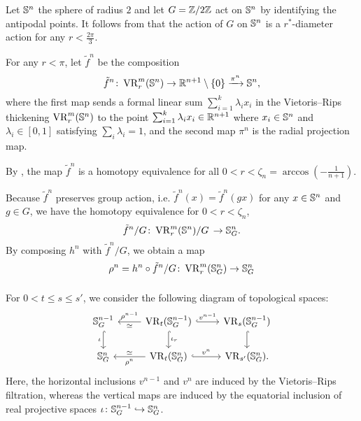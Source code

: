 Let $\mathbb{S}^n$ the sphere of radius $2$ and let $G=\mathbb{Z}/2\mathbb{Z}$ act on $\mathbb{S}^n$ by identifying the antipodal points.
It follows from \cite[Corollary]{adams2022metric} that the action of $G$ on $\mathbb{S}^n$ is a $r^*$-diameter action for any $r<\tfrac{2\pi}{3}$.

For any $r<\pi$, let $\tilde{f}^n$ be the composition
\[
    \tilde{f}^n \colon \operatorname{VR}_r^m(\mathbb{S}^n) \to \mathbb{R}^{n+1} \setminus \{0\} \xrightarrow{\pi^n} \mathbb{S}^n,
\]
where the first map sends a formal linear sum $\sum_{i=1}^k \lambda_i x_i$ in the Vietoris--Rips thickening $\operatorname{VR}_r^m(\mathbb{S}^n)$ to the point $\sum_{i=1}^k \lambda_i x_i \in \mathbb{R}^{n+1}$ where $x_i \in \mathbb{S}^n$ and $\lambda_i \in [0,1]$ satisfying $\sum_i\lambda_i=1$, and the second map $\pi^n$ is the radial projection map.

By \cite[Proposition 5.3]{adamaszek2018metric}, the map $\tilde{f}^n$ is a homotopy equivalence for all $0<r<\zeta_n=\arccos{(-\tfrac{1}{n+1})}$.


Because $\tilde{f}^n$ preserves group action, i.e. $\tilde{f}^n(x) = \tilde{f}^n(gx)$ for any $x\in \mathbb{S}^n$ and $g\in G$, we have the homotopy equivalence for $0<r<\zeta_n$, %
\[
\tilde{f}^n/G \colon 
\operatorname{VR}_r^m(\mathbb{S}^n)/G \, 
\to \mathbb{S}^n_G.
\]
By composing $h^n$ with $\tilde{f}^n/G$, we obtain a map 
\[
\rho^n = h^n \circ \tilde{f}^n/G 
\colon \operatorname{VR}_r^m(\mathbb{S}^n_G) \to \mathbb{S}^n_G
\]

\subsubsection{} 

For $0<t\leq s \leq s'$, we consider the following diagram of topological spaces:
\begin{equation}\label{d:fundamental_bars_diagram}
    \begin{tikzcd}
        \bS^{n-1}_G
        \ar[d, hook,"{\iota}" left]
        &
        \VR_t(\bS^{n-1}_G)
        \ar[d, hook,"\iota_r"]
        \ar[l, "\rho^{n-1}" above, "\simeq" below]
        \ar[r, hook, "v^{n-1}"]
        &
        \VR_{s}(\bS^{n-1}_G)
        \ar[d, hook]
        \\
        \bS^{n}_G
        &
        \VR_t(\bS^{n}_G)
        \ar[l, "\rho^n" below, "\simeq" above]
        \ar[r, hook, "v^{n}"]
        &
        \VR_{s'}(\bS^{n}_G).
    \end{tikzcd}
\end{equation}
Here, the horizontal inclusions $v^{n-1}$ and $v^n$ are induced by the Vietoris--Rips filtration, whereas the vertical maps are induced by the equatorial inclusion of real projective spaces $\iota \colon \mathbb{S}^{n-1}_G \hookrightarrow \mathbb{S}^{n}_G$.


